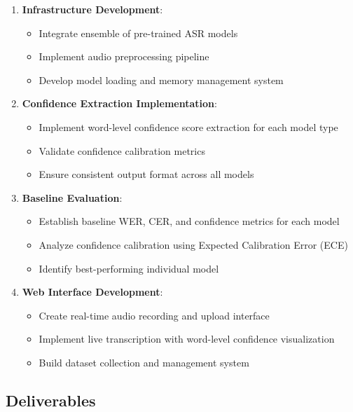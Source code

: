 \begin{enumerate}
    \item \textbf{Infrastructure Development}:
    \begin{itemize}
        \item Integrate ensemble of pre-trained ASR models
        \item Implement audio preprocessing pipeline
        \item Develop model loading and memory management system
    \end{itemize}
    
    \item \textbf{Confidence Extraction Implementation}:
    \begin{itemize}
        \item Implement word-level confidence score extraction for each model type
        \item Validate confidence calibration metrics
        \item Ensure consistent output format across all models
    \end{itemize}
    
    \item \textbf{Baseline Evaluation}:
    \begin{itemize}
        \item Establish baseline WER, CER, and confidence metrics for each model
        \item Analyze confidence calibration using Expected Calibration Error (ECE)
        \item Identify best-performing individual model
    \end{itemize}
    
    \item \textbf{Web Interface Development}:
    \begin{itemize}
        \item Create real-time audio recording and upload interface
        \item Implement live transcription with word-level confidence visualization
        \item Build dataset collection and management system
    \end{itemize}
\end{enumerate}

\subsection{Deliverables}

